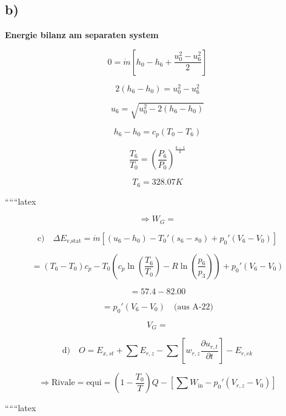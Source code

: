 

\subsection*{b)}

\textbf{Energie bilanz am separaten system}

\[
0 = \dot{m} \left[ h_0 - h_6 + \frac{u_0^2 - u_6^2}{2} \right]
\]

\[
2(h_6 - h_0) = u_0^2 - u_6^2
\]

\[
u_6 = \sqrt{u_0^2 - 2(h_6 - h_0)}
\]

\[
h_6 - h_0 = c_p (T_0 - T_6)
\]

\[
\frac{T_6}{T_0} = \left( \frac{P_6}{P_0} \right)^{\frac{k-1}{k}}
\]

\[
T_6 = 328.07 K
\]

``````latex


\[
\Rightarrow W_G =
\]

\[
\text{c)} \quad \Delta E_{\text{v,stat}} = \dot{m} \left[ (u_6 - h_0) - T_0' (s_6 - s_0) + p_0' (V_6 - V_0) \right]
\]

\[
= (T_6 - T_0) c_p - T_0 \left( c_p \ln \left( \frac{T_6}{T_0} \right) - R \ln \left( \frac{p_6}{p_3} \right) \right) + p_0' (V_6 - V_0)
\]

\[
= 57.4 - 82.00
\]

\[
= p_0' (V_6 - V_0) \quad \text{(aus A-22)}
\]

\[
V_G =
\]

\[
\text{d)} \quad O = E_{x,st} + \sum E_{r,z} - \sum \left[ w_{r,z} \frac{\partial u_{r,t}}{\partial t} \right] - E_{r,ek}
\]

\[
\Rightarrow \text{Rivale} = \text{equi} = \left( 1 - \frac{T_0}{T} \right) Q - \left[ \sum W_{\text{in}} - p_0' (V_{r,z} - V_0) \right]
\]

``````latex